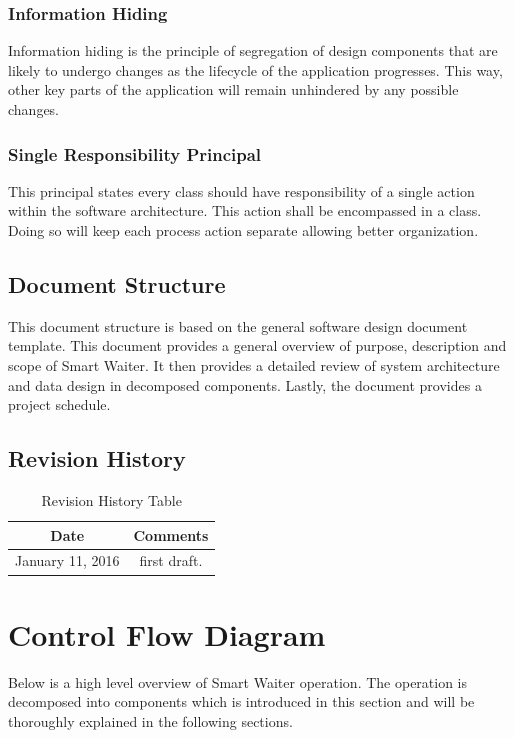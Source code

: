 \documentclass[12pt, titlepage]{article}
\begin{document}
\subsubsection{Information Hiding}
Information hiding is the principle of segregation of design components that are likely to undergo changes as the lifecycle of the application progresses. This way, other key parts of the application will remain unhindered by any possible changes.

\subsubsection{Single Responsibility Principal}
This principal states every class should have responsibility of a single action within the software architecture. This action shall be encompassed in a class. Doing so will keep each process action separate allowing better organization. 

\subsection{Document Structure}
This document structure is based on the general software design document template. This document provides a general overview of purpose, description and scope of Smart Waiter. It then provides a detailed review of system architecture and data design in decomposed components. Lastly, the document provides a project schedule. 

\subsection{Revision History}

\begin{table}[H]
\begin{tabular}{|c|c|}
\hline
\textbf{Date}  & \textbf{Comments} \\ \hline
January 11, 2016 &  first draft. \\ 
\hline
\end{tabular}
\caption{Revision History Table}
\end{table}

\section{Control Flow Diagram}
Below is a high level overview of Smart Waiter operation. The operation is decomposed into components which is introduced in this section and will be thoroughly explained in the following sections. 
\end{document}
